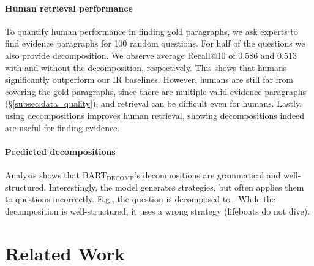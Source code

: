{\paragraph{Human retrieval performance}
To quantify human performance in finding gold paragraphs, we ask experts to find evidence paragraphs for 100 random questions. For half of the questions we also provide decomposition. 
We observe average Recall@10 of $0.586$ and $0.513$ with and without the decomposition, respectively. This shows that humans significantly outperform our IR baselines. However, humans are still far from covering the gold paragraphs, since there are multiple valid evidence paragraphs (\S\ref{subsec:data_quality}), and retrieval can be difficult even for humans.
Lastly, using decompositions improves human retrieval, showing decompositions indeed are useful for finding evidence.

\paragraph{Predicted decompositions}
Analysis shows that \textsc{BART$_{\text{DECOMP}}$}'s decompositions are grammatical and well-structured. Interestingly, the model generates strategies, but often applies them to questions incorrectly.
E.g., the question  is decomposed to . While the decomposition is  well-structured, it uses a wrong strategy (lifeboats do not dive).

\section{Related Work}
\label{sec:related_work}

\begin{comment}
\begin{itemize}
    \item Multi-step reasoning datasets (DROP, HotpotQA, CWQ, MultiQA, etc.)
    \item OpenBookQA and QASC - implicit reasoning, but limited to a specific domain (science) and only a single composition type.
    \item Datasets for common sense reasoning (CSQA, SWAG, etc.)
    \item Datasets for open-domain/natural questions (Natural Questions, BoolQ, WebQuestions, TriviaQA) - were not built for testing multi-step reasoning and therefore the questions either do not require reasoning or they can be decomposed based on the language of the question only. 
    \item Similar priming method? tydi-qa
\end{itemize}
\end{comment}

}
